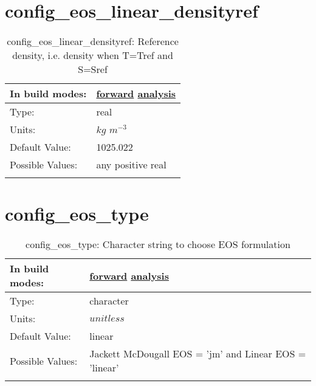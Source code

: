 \section[config\_eos\_linear\_densityref]{config\_eos\_linear\_densityref}
\label{sec:nm_sec_config_eos_linear_densityref}
\begin{center}
\begin{longtable}{| p{2.0in} || p{4.0in} |}
    \hline
    In build modes: & \hyperref[subsec:forward_nm_tab_eos_linear]{forward} \hyperref[subsec:analysis_nm_tab_eos_linear]{analysis} \\
    \hline
    Type: & real \\
    \hline
    Units: & $kg$ $m^{-3}$ \\
    \hline
    Default Value: & 1025.022 \\
    \hline
    Possible Values: & any positive real \\
    \hline
    \caption{config\_eos\_linear\_densityref: Reference density, i.e. density when T=Tref and S=Sref}
\end{longtable}
\end{center}
\section[config\_eos\_type]{config\_eos\_type}
\label{sec:nm_sec_config_eos_type}
\begin{center}
\begin{longtable}{| p{2.0in} || p{4.0in} |}
    \hline
    In build modes: & \hyperref[subsec:forward_nm_tab_eos]{forward} \hyperref[subsec:analysis_nm_tab_eos]{analysis} \\
    \hline
    Type: & character \\
    \hline
    Units: & $unitless$ \\
    \hline
    Default Value: & linear \\
    \hline
    Possible Values: & Jackett McDougall EOS = 'jm' and Linear EOS = 'linear' \\
    \hline
    \caption{config\_eos\_type: Character string to choose EOS formulation}
\end{longtable}
\end{center}

